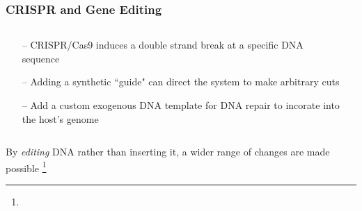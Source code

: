 \documentclass[xcolor=dvipsnames]{beamer}
\newcommand\blfootnote[1]{%
	\begingroup
	\renewcommand\thefootnote{}\footnote{#1}%
	\addtocounter{footnote}{-1}%
	\endgroup
}
\begin{document}
\begin{frame}
	\frametitle{CRISPR and Gene Editing}
	
	
	\begin{columns}
		\begin{column}{0.5\textwidth}
			\begin{itemize}
				\item[--] CRISPR/Cas9 induces a double strand break at a specific DNA sequence
				\item[--] Adding a synthetic ``guide" can direct the system to make arbitrary cuts
				\item[--] Add a custom exogenous DNA template for DNA repair to incorate into the host's genome
			\end{itemize}
		\end{column}
		\begin{column}{0.5\textwidth}
			\\
		\end{column}
	\end{columns}
	\vspace{10pt}
	
	
	
	By \textit{editing} DNA rather than inserting it, a wider range of changes are made possible
	\blfootnote{}
\end{frame}
\end{document}
